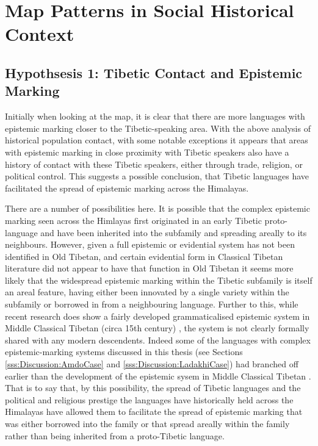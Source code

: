 \section{Map Patterns in Social Historical Context}\label{s:History:Correlations}
\subsection{Hypothsesis 1: Tibetic Contact and Epistemic Marking}
Initially when looking at the map, it is clear that there are more languages with epistemic marking closer to the Tibetic-speaking area. With the above analysis of historical population contact, with some notable exceptions it appears that areas with epistemic marking in close proximity with Tibetic speakers also have a history of contact with these Tibetic speakers, either through trade, religion, or political control. This suggests a possible conclusion, that Tibetic languages have facilitated the spread of epistemic marking across the Himalayas. 

There are a number of possibilities here. It is possible that the complex epistemic marking seen across the Himlayas first originated in an early Tibetic proto-language and have been inherited into the subfamily and spreading areally to its neighbours. However, given a full epistemic or evidential system has not been identified in Old Tibetan, and certain evidential form in Classical Tibetan literature did not appear to have that function in Old Tibetan \cite{Hill2014} it seems more likely that the widespread epistemic marking within the Tibetic subfamily is itself an areal feature, having either been innovated by a single variety within the subfamily or borrowed in from a neighbouring language. Further to this, while recent research does show a fairly developed grammaticalised epistemic system in Middle Classical Tibetan (circa 15th century) \cite{Oisel2024}, the system is not clearly formally shared with any modern descendents. Indeed some of the languages with complex epistemic-marking systems discussed in this thesis (see Sections \ref{sss:Discussion:AmdoCase} and \ref{sss:Discussion:LadakhiCase}) had branched off earlier than the development of the epistemic sysem in Middle Classical Tibetan \cite{Bialek2019}. That is to say that, by this possibility, the spread of Tibetic languages and the political and religious prestige the languages have historically held across the Himalayas have allowed them to facilitate the spread of epistemic marking that was either borrowed into the family or that spread areally within the family rather than being inherited from a proto-Tibetic language.

